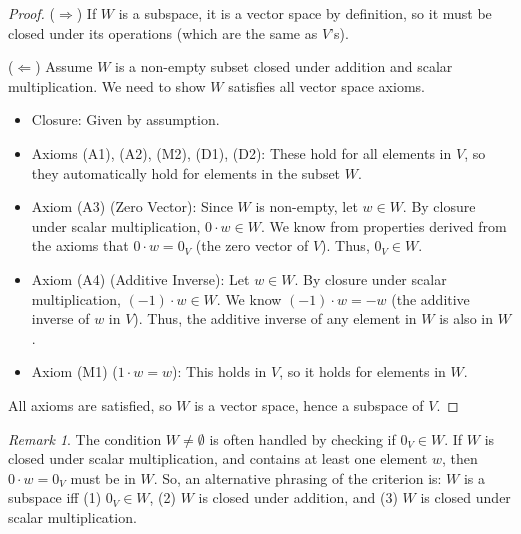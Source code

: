 \documentclass[11pt]{article}
\theoremstyle{definition}
\theoremstyle{remark}
\newtheorem{remark}[theorem]{Remark}
\begin{document}
\begin{proof}
($\Rightarrow$) If $W$ is a subspace, it is a vector space by definition, so it must be closed under its operations (which are the same as $V$'s).

($\Leftarrow$) Assume $W$ is a non-empty subset closed under addition and scalar multiplication. We need to show $W$ satisfies all vector space axioms.
\begin{itemize}
    \item Closure: Given by assumption.
    \item Axioms (A1), (A2), (M2), (D1), (D2): These hold for all elements in $V$, so they automatically hold for elements in the subset $W$.
    \item Axiom (A3) (Zero Vector): Since $W$ is non-empty, let $w \in W$. By closure under scalar multiplication, $0 \cdot w \in W$. We know from properties derived from the axioms that $0 \cdot w = 0_V$ (the zero vector of $V$). Thus, $0_V \in W$.
    \item Axiom (A4) (Additive Inverse): Let $w \in W$. By closure under scalar multiplication, $(-1) \cdot w \in W$. We know $(-1) \cdot w = -w$ (the additive inverse of $w$ in $V$). Thus, the additive inverse of any element in $W$ is also in $W$.
    \item Axiom (M1) ($1 \cdot w = w$): This holds in $V$, so it holds for elements in $W$.
\end{itemize}
All axioms are satisfied, so $W$ is a vector space, hence a subspace of $V$.
\end{proof}

\begin{remark}
The condition $W \neq \emptyset$ is often handled by checking if $0_V \in W$. If $W$ is closed under scalar multiplication, and contains at least one element $w$, then $0 \cdot w = 0_V$ must be in $W$. So, an alternative phrasing of the criterion is: $W$ is a subspace iff (1) $0_V \in W$, (2) $W$ is closed under addition, and (3) $W$ is closed under scalar multiplication.
\end{remark}
\end{document}
